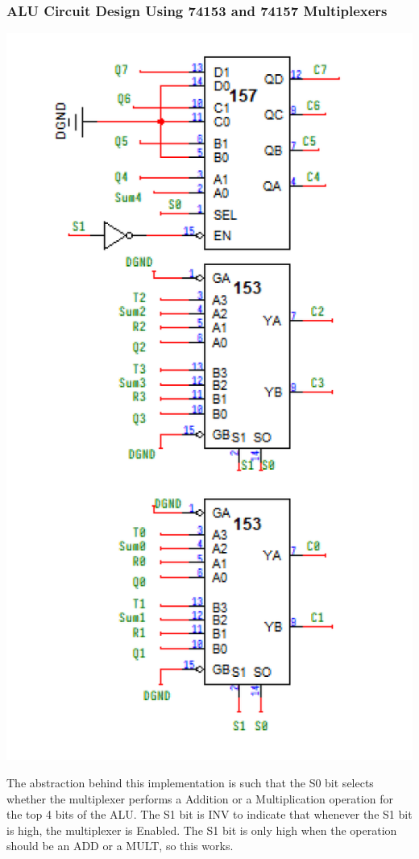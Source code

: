 \documentclass[12pt]{article}
\begin{document}
\subsubsection*{ALU Circuit Design Using 74153 and 74157 Multiplexers}
\begin{center}
	\includegraphics[scale=1]{examp061.png}
\end{center}
The abstraction behind this implementation is such that the S0 bit selects
whether the multiplexer performs a Addition or a Multiplication operation for
the top 4 bits of the ALU. The S1 bit is INV to indicate that whenever the
S1 bit is high, the multiplexer is Enabled. The S1 bit is only high when the
operation should be an ADD or a MULT, so this works.
\end{document}
